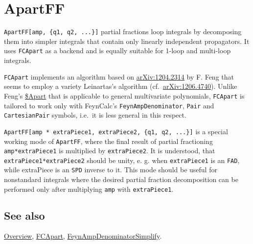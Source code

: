 \documentclass[../FeynCalcManual.tex]{subfiles}
\begin{document}
\begin{Shaded}
\begin{Highlighting}[]
 
\end{Highlighting}
\end{Shaded}

\hypertarget{apartff}{
\section{ApartFF}\label{apartff}}

\texttt{ApartFF[\allowbreak{}amp,\ \allowbreak{}\{\allowbreak{}q1,\ \allowbreak{}q2,\ \allowbreak{}...\}]}
partial fractions loop integrals by decomposing them into simpler
integrals that contain only linearly independent propagators. It uses
\texttt{FCApart} as a backend and is equally suitable for 1-loop and
multi-loop integrals.

\texttt{FCApart} implements an algorithm based on
\href{https://arxiv.org/abs/1204.2314}{arXiv:1204.2314} by F. Feng that
seems to employ a variety Leinartas's algorithm
(cf.~\href{https://arxiv.org/abs/1206.4740}{arXiv:1206.4740}). Unlike
Feng's \href{https://github.com/F-Feng/APart}{\$Apart} that is
applicable to general multivariate polynomials, \texttt{FCApart} is
tailored to work only with FeynCalc's \texttt{FeynAmpDenominator},
\texttt{Pair} and \texttt{CartesianPair} symbols, i.e.~it is less
general in this respect.

\texttt{ApartFF[\allowbreak{}amp * extraPiece1,\ \allowbreak{}extraPiece2,\ \allowbreak{}\{\allowbreak{}q1,\ \allowbreak{}q2,\ \allowbreak{}...\}]}
is a special working mode of \texttt{ApartFF}, where the final result of
partial fractioning \texttt{amp*extraPiece1} is multiplied by
\texttt{extraPiece2}. It is understood, that
\texttt{extraPiece1*extraPiece2} should be unity, e. g. when
\texttt{extraPiece1} is an \texttt{FAD}, while extraPiece is an
\texttt{SPD} inverse to it. This mode should be useful for nonstandard
integrals where the desired partial fraction decomposition can be
performed only after multiplying \texttt{amp} with \texttt{extraPiece1}.

\subsection{See also}

\hyperlink{toc}{Overview}, \hyperlink{fcapart}{FCApart},
\hyperlink{feynampdenominatorsimplify}{FeynAmpDenominatorSimplify}.
\end{document}
